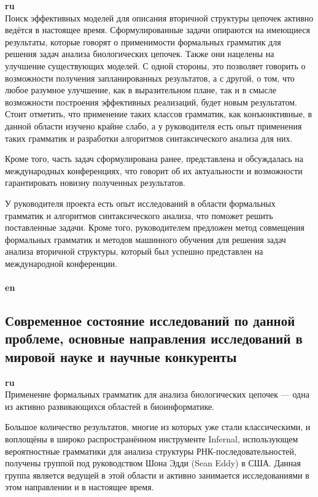 \documentclass[12pt]{article}  %
\theoremstyle{remark}
\begin{document}
\textbf{ru}\\
Поиск эффективных моделей для описания вторичной структуры цепочек активно ведётся в настоящее время.
Сформулированные задачи опираются на имеющиеся результаты, которые говорят о применимости формальных грамматик для решения задач анализа биологических цепочек. Также они нацелены на улучшение существующих моделей.
С одной стороны, это позволяет говорить о возможности получения запланированных результатов, а с другой, о том, что любое разумное улучшение, как в выразительном плане, так и в смысле возможности построения эффективных реализаций, будет новым результатом.
Стоит отметить, что применение таких классов грамматик, как конъюнктивные, в данной области изучено крайне слабо, а у руководителя есть опыт применения таких грамматик и разработки алгоритмов синтаксического анализа для них.

Кроме того, часть задач сформулирована ранее, представлена и обсуждалась на международных конференциях, что говорит об их актуальности и возможности гарантировать новизну полученных результатов.

У руководителя проекта есть опыт исследований в области формальных грамматик и алгоритмов синтаксического анализа, что поможет решить поставленные задачи.
Кроме того, руководителем предложен метод совмещения формальных грамматик и методов машинного обучения для решения задач анализа вторичной структуры, который был успешно представлен на международной конференции.
\\
\\
\textbf{en}\\


\subsection{Современное состояние исследований по данной проблеме, основные направления исследований в мировой науке и научные конкуренты}

\textbf{ru}\\
Применение формальных грамматик для анализа биологических цепочек --- одна из активно развивающихся областей в биоинформатике.

Большое количество результатов, многие из которых уже стали классическими, и воплощёны в широко распространённом инструменте Infernal, использующем вероятностные грамматики для анализа структуры РНК-последовательностей, получены группой под руководством Шона Эдди (Sean Eddy) в США.
Данная группа является ведущей в этой области и активно занимается исследованиями в этом направлении и в настоящее время.
\end{document}
